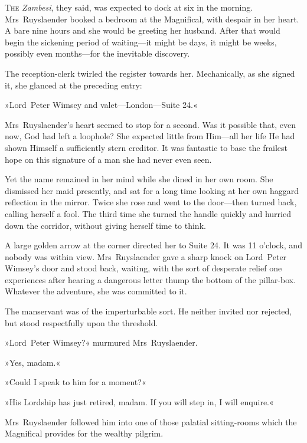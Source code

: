 
\lettrine[lines=4]{T}{he} \textit{Zambesi}, they said, was expected to dock at six in the morning. Mrs~Ruyslaender booked a bedroom at the Magnifical, with despair in her heart. A bare nine hours and she would be greeting her husband. After that would begin the sickening period of waiting—it might be days, it might be weeks, possibly even months—for the inevitable discovery.

The reception-clerk twirled the register towards her. Mechanically, as she signed it, she glanced at the preceding entry:

»Lord~Peter Wimsey and valet—London—Suite 24.«

Mrs~Ruyslaender's heart seemed to stop for a second. Was it possible that, even now, God had left a loophole? She expected little from Him—all her life He had shown Himself a sufficiently stern creditor. It was fantastic to base the frailest hope on this signature of a man she had never even seen.

Yet the name remained in her mind while she dined in her own room. She dismissed her maid presently, and sat for a long time looking at her own haggard reflection in the mirror. Twice she rose and went to the door—then turned back, calling herself a fool. The third time she turned the handle quickly and hurried down the corridor, without giving herself time to think.

A large golden arrow at the corner directed her to Suite 24. It was 11 o'clock, and nobody was within view. Mrs~Ruyslaender gave a sharp knock on Lord~Peter Wimsey's door and stood back, waiting, with the sort of desperate relief one experiences after hearing a dangerous letter thump the bottom of the pillar-box. Whatever the adventure, she was committed to it.

The manservant was of the imperturbable sort. He neither invited nor rejected, but stood respectfully upon the threshold.

»Lord~Peter Wimsey?« murmured Mrs~Ruyslaender.

»Yes, madam.«

»Could I speak to him for a moment?«

»His Lordship has just retired, madam. If you will step in, I will enquire.«

Mrs~Ruyslaender followed him into one of those palatial sitting-rooms which the Magnifical provides for the wealthy pilgrim.

